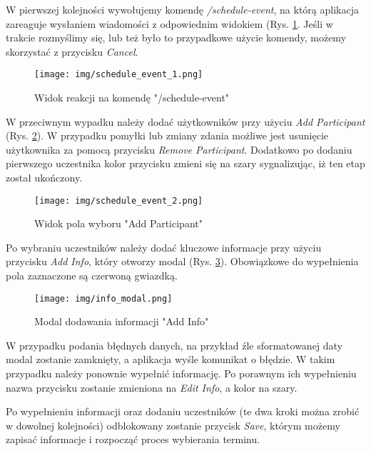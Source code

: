 \documentclass[11pt,a4paper]{article}
\begin{document}
W pierwszej kolejności wywołujemy komendę \textit{/schedule-event}, na którą aplikacja zareaguje wysłaniem wiadomości z odpowiednim widokiem (Rys. \ref{fig: schedule event first}. Jeśli w trakcie rozmyślimy się, lub też było to przypadkowe użycie komendy, możemy skorzystać z przycisku \textit{Cancel}.

\begin{figure}[H]
    \centering
    \texttt{[image: img/schedule\_event\_1.png]}
    \caption{Widok reakcji na komendę "/schedule-event"}
    \label{fig: schedule event first}
\end{figure}

W przeciwnym wypadku należy dodać użytkowników przy użyciu \textit{Add Participant} (Rys. \ref{fig: schedule event add participant}). W przypadku pomyłki lub zmiany zdania możliwe jest usunięcie użytkownika za pomocą przycisku \textit{Remove Participant}. Dodatkowo po dodaniu pierwszego uczestnika kolor przycisku zmieni się na szary sygnalizując, iż ten etap został ukończony.

\begin{figure}[H]
    \centering
    \texttt{[image: img/schedule\_event\_2.png]}
    \caption{Widok pola wyboru "Add Participant"}
    \label{fig: schedule event add participant}
\end{figure}

Po wybraniu uczestników należy dodać kluczowe informacje przy użyciu przycisku \textit{Add Info}, który otworzy modal (Rys. \ref{fig: schedule event add info}). Obowiązkowe do wypełnienia pola zaznaczone są czerwoną gwiazdką.

\begin{figure}[H]
    \centering
    \texttt{[image: img/info\_modal.png]}
    \caption{Modal dodawania informacji "Add Info"}
    \label{fig: schedule event add info}
\end{figure}

W przypadku podania błędnych danych, na przykład źle sformatowanej daty modal zostanie zamknięty, a aplikacja wyśle komunikat o błędzie. W takim przypadku należy ponownie wypełnić informację. Po porawnym ich wypełnieniu nazwa przycisku zostanie zmieniona na \textit{Edit Info}, a kolor na szary.

Po wypełnieniu informacji oraz dodaniu uczestników (te dwa kroki można zrobić w dowolnej kolejności) odblokowany zostanie przycisk \textit{Save}, którym możemy zapisać informacje i rozpocząć proces wybierania terminu.
\end{document}
